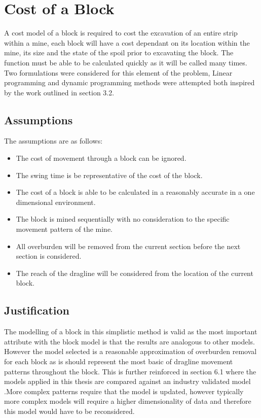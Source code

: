 \section{Cost of a Block}
A cost model of a block is required to cost the excavation of an entire strip within a  mine,  each block will have a cost dependant on its location within the mine, its size and the state of the spoil prior to excavating the block. The function must be able to be calculated quickly as it will be called many times. Two  formulations were considered for this element of the problem, Linear programming and dynamic programming methods were attempted both inspired by the work outlined in section 3.2.
\subsection{Assumptions}
The assumptions are as follows: \begin{itemize}
\item The cost of movement through a block can be ignored.
\item The swing time is be representative of the cost of the block.
\item The cost of a block is able to be calculated in a reasonably accurate in a one dimensional environment.
\item The block is mined sequentially with no consideration to the specific movement pattern of the mine.
\item All overburden will be removed from the current section before the next section is considered.
\item The reach of the dragline will be considered from the location of the current block. 
 \end{itemize}

\subsection{Justification}
The modelling of a block in this simplistic method is valid as the most important attribute with the block model is that the results are analogous to other models.  However the model selected is a reasonable approximation of overburden removal for each block as is should represent the most basic of dragline movement patterns throughout the block. This is further reinforced in  section 6.1 where the models applied in this thesis are compared against an industry validated model \cite{ORLeslie}.More complex patterns require that the model is updated, however typically more complex models will require a higher dimensionality of data and therefore this model would have to be reconsidered.  


